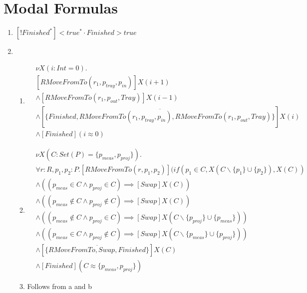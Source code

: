\section{Modal Formulas}\label{sec:modal_formulas}
\begin{enumerate}
    \item $[!Finished^{*}]<true^{*} \cdot Finished>true$
    \item \begin{enumerate}
        \item \begin{align*}
            &\nu X(i:Int = 0) . & \\
            &[RMoveFromTo(r_1, p_\mathit{tray}, p_\mathit{in})]X(i+1) \\
            &\wedge [RMoveFromTo(r_1, p_\mathit{out}, Tray)]X(i-1) \\
            &\wedge [\overline{\{Finished,RMoveFromTo(r_1, p_\mathit{tray}, p_\mathit{in}),RMoveFromTo(r_1, p_\mathit{out}, Tray)\}}]X(i) \\
            &\wedge [Finished](i \approx 0)
        \end{align*}
        \item \begin{align*}
            &\nu X(C : Set(P) = \{p_\mathit{meas},p_\mathit{proj}\}).\\
            & \forall r:R, p_1, p_2 : P . [RMoveFromTo(r, p_1, p_2)](if(p_1 \in C, X(C\backslash\{p_1\}\cup\{p_2\}), X(C))\\
            &\wedge ((p_\mathit{meas} \in C \wedge p_\mathit{proj} \in C) \implies [Swap]X(C))\\
            &\wedge ((p_\mathit{meas} \notin C \wedge p_\mathit{proj} \notin C) \implies [Swap]X(C))\\
            &\wedge ((p_\mathit{meas} \notin C \wedge p_\mathit{proj} \in C) \implies [Swap]X(C\backslash\{p_\mathit{proj}\} \cup \{p_\mathit{meas}\}))\\
            &\wedge ((p_\mathit{meas} \in C \wedge p_\mathit{proj} \notin C) \implies [Swap]X(C\backslash\{p_\mathit{meas}\} \cup \{p_\mathit{proj}\}))\\
            &\wedge [\overline{\{RMoveFromTo, Swap, Finished\}}]X(C)\\
            &\wedge [Finished](C \approx \{p_\mathit{meas},p_\mathit{proj}\})
        \end{align*}
        \item Follows from a and b
    \end{enumerate}

\end{enumerate}
